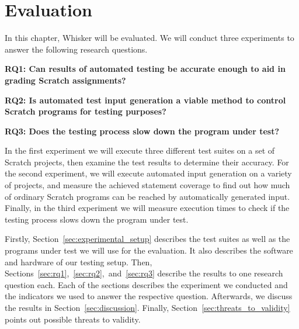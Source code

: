 

\chapter{Evaluation}%
\label{cha:evaluation}

In this chapter, Whisker will be evaluated.
We will conduct three experiments to answer the following research questions.

{
    \parspace

    \centering
    \begin{minipage}{.9\textwidth}
        \textbf{RQ1: Can results of automated testing be accurate enough to aid in grading Scratch assignments?}
        \parspace

        \noindent \textbf{RQ2: Is automated test input generation a viable method to control Scratch programs for testing purposes?}
        \parspace

        \noindent \textbf{RQ3: Does the testing process slow down the program under test?}
    \end{minipage}

    \parspace
}


\noindent In the first experiment we will execute three different test suites on a set of Scratch projects,
then examine the test results to determine their accuracy.
For the second experiment, we will execute automated input generation on a variety of projects,
and measure the achieved statement coverage to find out how much of ordinary Scratch programs
can be reached by automatically generated input.
Finally, in the third experiment we will measure execution times
to check if the testing process slows down the program under test.
\parspace

Firstly, Section~\ref{sec:experimental_setup} describes the test suites as well as the programs under test we will use for the evaluation.
It also describes the software and hardware of our testing setup.
Then, Sections~\ref{sec:rq1},~\ref{sec:rq2},~and~\ref{sec:rq3} describe the results to one research question each.
Each of the sections describes the experiment we conducted and the indicators we used
to answer the respective question.
Afterwards, we discuss the results in Section~\ref{sec:discussion}.
Finally, Section~\ref{sec:threats_to_validity} points out possible threats to validity.

